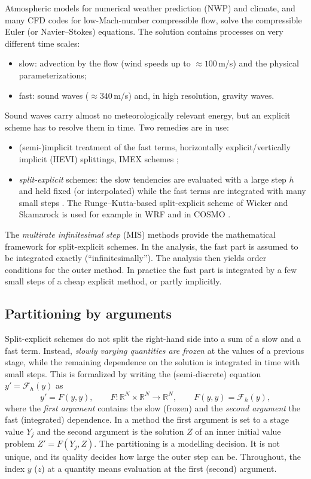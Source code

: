 \documentclass[11pt,a4paper]{article}
\theoremstyle{definition}
\theoremstyle{remark}
\newcommand{\R}{\mathbb{R}}
\begin{document}
Atmospheric models for numerical weather prediction (NWP) and climate,
and many CFD codes for low-Mach-number compressible flow, solve the
compressible Euler (or Navier--Stokes) equations. The solution contains
processes on very different time scales:
\begin{itemize}
\item slow: advection by the flow (wind speeds up to $\approx100\,$m/s)
  and the physical parameterizations;
\item fast: sound waves ($\approx340\,$m/s) and, in high resolution,
  gravity waves.
\end{itemize}
Sound waves carry almost no meteorologically relevant energy, but an
explicit scheme has to resolve them in time. Two remedies are in use:
\begin{itemize}
\item (semi-)implicit treatment of the fast terms, horizontally
  explicit/vertically implicit (HEVI) splittings, IMEX schemes
  \cite{BoscarinoFilbetRusso2016,GiraldoKellyConstantinescu2013};
\item \emph{split-explicit} schemes: the slow tendencies are evaluated
  with a large step $h$ and held fixed (or interpolated) while the fast
  terms are integrated with many small steps
  \cite{KlempWilhelmson1978,WickerSkamarock2002,KlempSkamarockDudhia2007}.
  The Runge--Kutta-based split-explicit scheme of Wicker and Skamarock is
  used for example in WRF and in COSMO \cite{Baldauf2010}.
\end{itemize}
The \emph{multirate infinitesimal step} (MIS) methods
\cite{KnothWolke1998,WenschKnothGalant2009,KnothWensch2014} provide the
mathematical framework for split-explicit schemes. In the analysis, the
fast part is assumed to be integrated exactly (``infinitesimally''). The
analysis then yields order conditions for the outer method. In practice
the fast part is integrated by a few small steps of a cheap explicit
method, or partly implicitly.

\subsection{Partitioning by arguments}

Split-explicit schemes do not split the right-hand side into a sum of a
slow and a fast term. Instead, \emph{slowly varying quantities are
frozen} at the values of a previous stage, while the remaining
dependence on the solution is integrated in time with small steps. This
is formalized by writing the (semi-discrete) equation $y'=\mathcal F_h(y)$
as
\begin{equation}\label{eq:G}
y' = F(y,y), \qquad F:\R^N\times\R^N\to\R^N,\qquad F(y,y)=\mathcal F_h(y), \tag{$\mathcal G$}
\end{equation}
where the \emph{first argument} contains the slow (frozen) and the
\emph{second argument} the fast (integrated) dependence. In a method the
first argument is set to a stage value $Y_j$ and the second argument is
the solution $Z$ of an inner initial value problem
$Z'=F(Y_j,Z)$. The partitioning is a modelling decision. It is not
unique, and its quality decides how large the outer step can be.
Throughout, the index $y$ ($z$) at a quantity means evaluation at the
first (second) argument.
\end{document}
